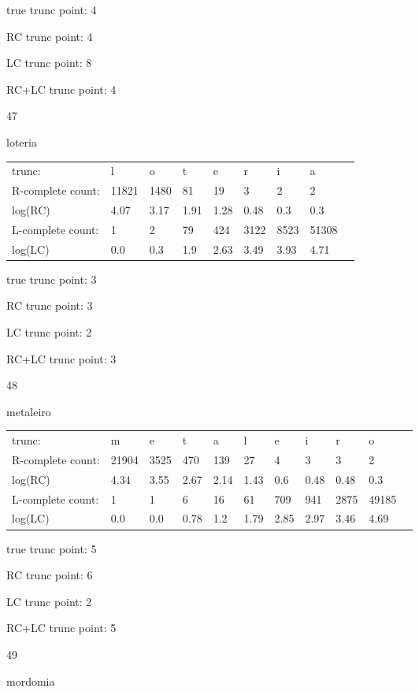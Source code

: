 \documentclass{article}
\begin{document}
true trunc point: 4

RC trunc point: 4

LC trunc point: 8

RC+LC trunc point: 4

\vspace{1em}

47

loteria

\begin{tabular}{l|llllllll}
trunc: & l & o & t & e & r & i & a & \\ 
R-complete count: & 11821 & 1480 & 81 & 19 & 3 & 2 & 2 & \\ 
log(RC) & 4.07 & 3.17 & 1.91 & 1.28 & 0.48 & 0.3 & 0.3 & \\ 
L-complete count: & 1 & 2 & 79 & 424 & 3122 & 8523 & 51308 & \\ 
log(LC) & 0.0 & 0.3 & 1.9 & 2.63 & 3.49 & 3.93 & 4.71 & \\ 
\end{tabular}

true trunc point: 3

RC trunc point: 3

LC trunc point: 2

RC+LC trunc point: 3

\vspace{1em}

48

metaleiro

\begin{tabular}{l|llllllllll}
trunc: & m & e & t & a & l & e & i & r & o & \\ 
R-complete count: & 21904 & 3525 & 470 & 139 & 27 & 4 & 3 & 3 & 2 & \\ 
log(RC) & 4.34 & 3.55 & 2.67 & 2.14 & 1.43 & 0.6 & 0.48 & 0.48 & 0.3 & \\ 
L-complete count: & 1 & 1 & 6 & 16 & 61 & 709 & 941 & 2875 & 49185 & \\ 
log(LC) & 0.0 & 0.0 & 0.78 & 1.2 & 1.79 & 2.85 & 2.97 & 3.46 & 4.69 & \\ 
\end{tabular}

true trunc point: 5

RC trunc point: 6

LC trunc point: 2

RC+LC trunc point: 5

\newpage

49

mordomia
\end{document}
